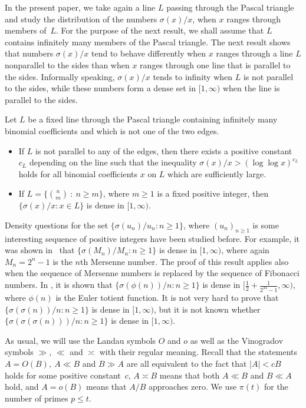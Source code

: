 \documentclass[twoside,amsthm]{elsart}
\begin{document}
In the present paper, we take again a line $L$ passing through the
Pascal triangle and study the distribution of the numbers
$\sigma(x)/x$, when $x$ ranges through members of~$L$. For the
purpose of the next result, we shall assume that $L$ contains
infinitely many members of the Pascal triangle. The next result
shows that numbers $\sigma(x)/x$ tend to behave differently when $x$
ranges through a line $L$ nonparallel to the sides than when $x$
ranges through one line that is parallel to the sides. Informally
speaking, $\sigma(x)/x$ tends to infinity when $L$ is not parallel
to the sides, while these numbers form a dense set in $[1,\infty)$
when the line is parallel to the sides.

\begin{thm}
\label{thm:dens} Let $L$ be a fixed line through the Pascal triangle
containing infinitely many binomial coefficients and which is not
one of the two edges.
\begin{itemize}\leftskip=10pt
\item[\normalfont (i)] If $L$ is not parallel to any of the edges, 
then there exists a positive constant $c_L$ depending on the line such 
that the inequality $\sigma(x)/x>(\log\log x)^{c_L}$ holds for all 
binomial coefficients $x$ on $L$ which are sufficiently large.
\item[\normalfont (ii)] If $L=\{\binom{n}{m}~:~n\ge m\}$, where 
$m\ge 1$ is a fixed positive integer, then $\{\sigma(x)/x:x\in L\}$ 
is dense in $[1,\infty)$.
\end{itemize}
\end{thm}

Density questions for the set $\{\sigma(u_n)/u_n:n\ge 1\}$, where
$(u_n)_{n\ge 1}$ is some interesting sequence of positive integers
have been studied before. For example, it was shown in~\cite{Lu5}
that $\{\sigma(M_n)/M_n:n\ge 1\}$ is dense in $[1,\infty)$, where
again $M_n=2^n-1$ is the $n$th Mersenne number. The proof of this
result applies also when the sequence of Mersenne numbers is
replaced by the sequence of Fibonacci numbers. In \cite{LuPo}, it is
shown that $\{\sigma(\phi(n))/n : n\ge 1\}$ is dense in
$[\frac{1}{2}+\frac{1}{2^{34}-1},\infty)$, where $\phi(n)$ is the
Euler totient function. It is not very hard to
prove that $\{\sigma(\sigma(n))/n:n\ge 1\}$ is dense in
$[1,\infty)$, but it is not known whether
$\{\sigma(\sigma(\sigma(n)))/n:n\ge 1\}$ is dense in $[1,\infty)$.

As usual, we will use the Landau symbols $O$ and $o$ as well as the
Vinogradov symbols $\gg$, $\ll$ and $\asymp$ with their regular
meaning. Recall that the statements $A=O(B),~A\ll B$ and $B\gg A$
are all equivalent to the fact that $|A|<cB$ holds for some positive
constant~$c$, $A\asymp B$ means that both $A\ll B$ and $B\ll A$
hold, and $A=o(B)$ means that $A/B$ approaches zero. We use $\pi(t)$
for the number of primes $p\le t$.
\end{document}
